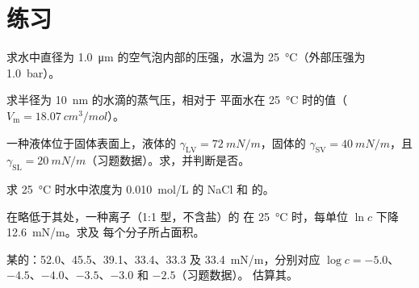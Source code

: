 \section{练习}

\begin{exercise}[$\star$]\label{exo:b3:colloids:1}
求水中直径为 \qty{1.0}{\micro m} 的空气泡内部的压强，水温为
\qty{25}{\celsius}（外部压强为 \qty{1.0}{bar}）。
\end{exercise}

\begin{exercise}[$\star$]\label{exo:b3:colloids:2}
求半径为 \qty{10}{nm} 的水滴的蒸气压，相对于
平面水在 \qty{25}{\celsius} 时的值（$V_{\mathrm m} = \qty{18.07}{cm^3/mol}$）。
\end{exercise}

\begin{exercise}[$\star$]\label{exo:b3:colloids:3}
一种液体位于固体表面上，液体的 $\gamma_{\mathrm{LV}} = \qty{72}{mN/m}$，固体的 $\gamma_{\mathrm{SV}} = \qty{40}{mN/m}$，且 $\gamma_{\mathrm{SL}} =
\qty{20}{mN/m}$（习题数据）。求，并判断是否。
\end{exercise}

\begin{exercise}[$\star$]\label{exo:b3:colloids:4}
求 \qty{25}{\celsius} 时水中浓度为 \qty{0.010}{mol/L} 的 NaCl 和
 的。
\end{exercise}

\begin{exercise}[$\star\star$]\label{exo:b3:colloids:5}
在略低于其处，一种离子（1:1 型，不含盐）的
在 \qty{25}{\celsius} 时，每单位 $\ln c$ 下降 \qty{12.6}{mN/m}。求及
每个分子所占面积。
\end{exercise}

\begin{exercise}[$\star\star$]\label{exo:b3:colloids:6}
某的：52.0、45.5、39.1、33.4、33.3 及
\qty{33.4}{mN/m}，分别对应 $\log c = -5.0$、$-4.5$、$-4.0$、$-3.5$、$-3.0$ 和 $-2.5$（习题数据）。
估算其。
\end{exercise}

